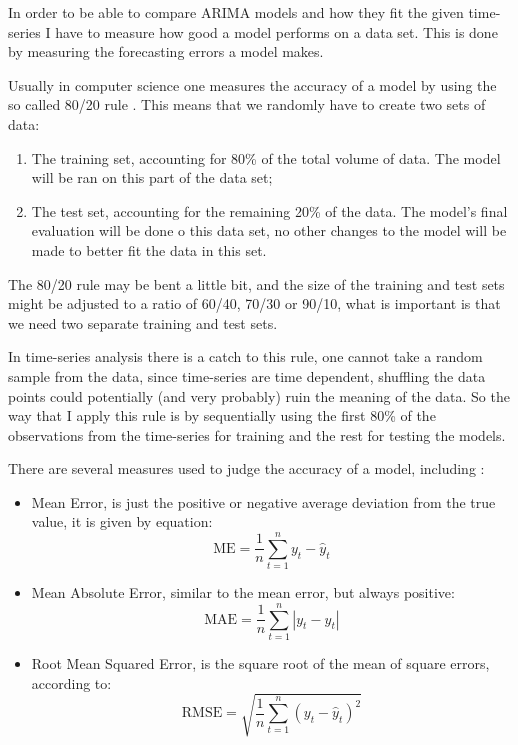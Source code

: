 \documentclass[12pt,a4paper,titlepage]{report}
\begin{document}
In order to be able to compare ARIMA models and how they fit the given time-series I have to measure how good a model performs on a data set.
This is done by measuring the forecasting errors a model makes.

Usually in computer science one measures the accuracy of a model by using the so called 80/20 rule \cite{8020rule}. This means that we randomly have to create two sets of data:

\begin{enumerate}
    \item The training set, accounting for 80\% of the total volume of data. The model will be ran on this part of the data set;
    \item The test set, accounting for the remaining 20\% of the data. The model's final evaluation will be done o this data set, no other changes to the model will be made to better fit the data in this set.
\end{enumerate}

The 80/20 rule may be bent a little bit, and the size of the training and test sets might be adjusted to a ratio of 60/40, 70/30 or 90/10, what is important is that we need two separate training and test sets.

In time-series analysis there is a catch to this rule, one cannot take a random sample from the data, since time-series are time dependent, shuffling the data points could potentially (and very probably) ruin the meaning of the data. So the way that I apply this rule is by sequentially using the first 80\% of the observations from the time-series for training and the rest for testing the models.

There are several measures used to judge the accuracy of a model, including \cite{Hyndman06anotherlook}:
\begin{itemize}
    \item Mean Error, is just the positive or negative average deviation from the true value, it is given by equation:
    \[\text{ME} = \frac{1}{n} \sum_{t=1}^{n} y_{t}-\hat{y}_{t}\]
    
    \item Mean Absolute Error, similar to the mean error, but always positive:
    \[\text{MAE} = \frac{1}{n} \sum_{t=1}^{n} |y_{t}-\hat{y}_{t}|\]
    
    \item Root Mean Squared Error, is the square root of the mean of square errors, according to: 
    \[\text{RMSE} = \sqrt{\frac{1}{n} \sum_{t=1}^{n} (y_{t}-\hat{y}_{t})^2}\]
\end{itemize}
\end{document}

